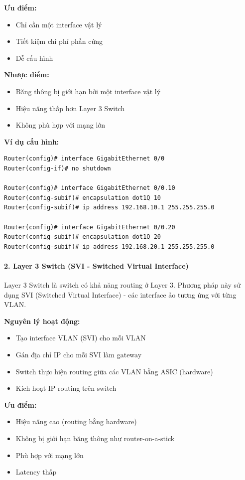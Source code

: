 \textbf{Ưu điểm:}
\begin{itemize}
    \item Chỉ cần một interface vật lý
    \item Tiết kiệm chi phí phần cứng
    \item Dễ cấu hình
\end{itemize}

\textbf{Nhược điểm:}
\begin{itemize}
    \item Băng thông bị giới hạn bởi một interface vật lý
    \item Hiệu năng thấp hơn Layer 3 Switch
    \item Không phù hợp với mạng lớn
\end{itemize}

\textbf{Ví dụ cấu hình:}
\begin{verbatim}
Router(config)# interface GigabitEthernet 0/0
Router(config-if)# no shutdown

Router(config)# interface GigabitEthernet 0/0.10
Router(config-subif)# encapsulation dot1Q 10
Router(config-subif)# ip address 192.168.10.1 255.255.255.0

Router(config)# interface GigabitEthernet 0/0.20
Router(config-subif)# encapsulation dot1Q 20
Router(config-subif)# ip address 192.168.20.1 255.255.255.0
\end{verbatim}

\paragraph{2. Layer 3 Switch (SVI - Switched Virtual Interface)}
Layer 3 Switch là switch có khả năng routing ở Layer 3. Phương pháp này sử dụng SVI (Switched Virtual Interface) - các interface ảo tương ứng với từng VLAN.

\textbf{Nguyên lý hoạt động:}
\begin{itemize}
    \item Tạo interface VLAN (SVI) cho mỗi VLAN
    \item Gán địa chỉ IP cho mỗi SVI làm gateway
    \item Switch thực hiện routing giữa các VLAN bằng ASIC (hardware)
    \item Kích hoạt IP routing trên switch
\end{itemize}

\textbf{Ưu điểm:}
\begin{itemize}
    \item Hiệu năng cao (routing bằng hardware)
    \item Không bị giới hạn băng thông như router-on-a-stick
    \item Phù hợp với mạng lớn
    \item Latency thấp
\end{itemize}

